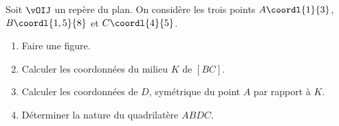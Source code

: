 \begin{exo}{}
	Soit $\vOIJ$ un repère du plan. On considère les trois points $A\coordl{1}{3}$, $B\coordl{1,5}{8}$ et $C\coordl{4}{5}$.

	\begin{enumerate}
		\item Faire une figure.
		\item Calculer les coordonnées du milieu $K$ de $[BC]$.
		\item Calculer les coordonnées de $D$, symétrique du point $A$ par rapport à $K$.
		\item Déterminer la nature du quadrilatère $ABDC$.
	\end{enumerate}
\end{exo}

